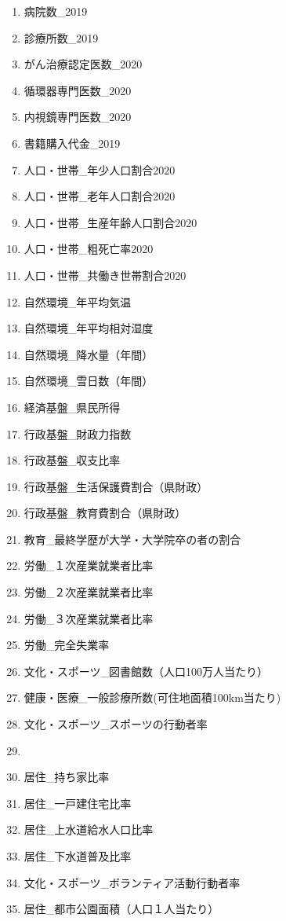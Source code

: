 \begin{enumerate}
  \item  病院数\_2019
  \item  診療所数\_2019
  \item  がん治療認定医数\_2020
  \item  循環器専門医数\_2020
  \item  内視鏡専門医数\_2020
  \item  書籍購入代金\_2019
  \item  人口・世帯\_年少人口割合2020
  \item  人口・世帯\_老年人口割合2020
  \item  人口・世帯\_生産年齢人口割合2020
  \item  人口・世帯\_粗死亡率2020
  \item  人口・世帯\_共働き世帯割合2020
  \item  自然環境\_年平均気温
  \item  自然環境\_年平均相対湿度
  \item  自然環境\_降水量（年間）
  \item  自然環境\_雪日数（年間）
  \item  経済基盤\_県民所得
  \item  行政基盤\_財政力指数
  \item  行政基盤\_収支比率
  \item  行政基盤\_生活保護費割合（県財政）
  \item  行政基盤\_教育費割合（県財政）
  \item  教育\_最終学歴が大学・大学院卒の者の割合
  \item  労働\_１次産業就業者比率
  \item  労働\_２次産業就業者比率
  \item  労働\_３次産業就業者比率
  \item  労働\_完全失業率
  \item  文化・スポーツ\_図書館数（人口100万人当たり）
  \item  健康・医療\_一般診療所数(可住地面積100km当たり)
  \item  文化・スポーツ\_スポーツの行動者率
  \item
  \item  居住\_持ち家比率
  \item  居住\_一戸建住宅比率
  \item  居住\_上水道給水人口比率
  \item  居住\_下水道普及比率
  \item  文化・スポーツ\_ボランティア活動行動者率
  \item  居住\_都市公園面積（人口１人当たり）

\end{enumerate}
